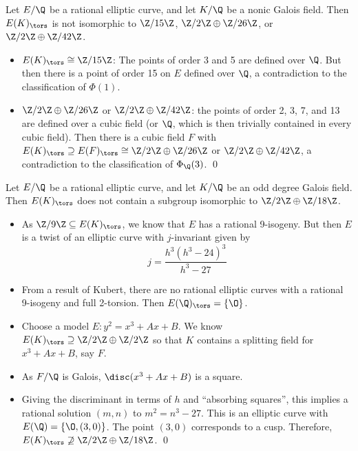 \begin{frame}[plain]
\begin{lem}
Let $E/\Q$ be a rational elliptic curve, and let $K/\Q$ be a nonic Galois field. Then $E(K)_\tors$ is not isomorphic to $\Z/15\Z$, $\Z/2\Z \oplus \Z/26\Z$, or $\Z/2\Z \oplus \Z/42\Z$. 
\end{lem}

\pf 
\begin{itemize}
\item $E(K)_\tors \cong \Z/15\Z$: The points of order 3 and 5 are defined over $\Q$. But then there is a point of order 15 on $E$ defined over $\Q$, a contradiction to the classification of $\Phi(1)$. 
\item $\Z/2\Z \oplus \Z/26\Z$ or $\Z/2\Z \oplus \Z/42\Z$: the points of order 2, 3, 7, and 13 are defined over a cubic field (or $\Q$, which is then trivially contained in every cubic field). Then there is a cubic field $F$ with $E(K)_\tors \supseteq E(F)_\tors \cong \Z/2\Z \oplus \Z/26\Z$ or $\Z/2\Z \oplus \Z/42\Z$, a contradiction to the classification of $\Phi_\Q(3)$. \hfill\qed
\end{itemize}
\end{frame}





\begin{frame}[plain]
\footnotesize
\begin{lem}
Let $E/\Q$ be a rational elliptic curve, and let $K/\Q$ be an odd degree Galois field. Then $E(K)_\tors$ does not contain a subgroup isomorphic to $\Z/2\Z \oplus \Z/18\Z$. 
\end{lem}

\pf 
\begin{itemize} 
\item As $\Z/9\Z \subseteq E(K)_\tors$, we know that $E$ has a rational 9-isogeny. But then $E$ is a twist of an elliptic curve with $j$-invariant given by
	\[
	j= \dfrac{h^3(h^3 - 24)^3}{h^3 - 27}
	\]
\item From a result of Kubert, there are no rational elliptic curves with a rational 9-isogeny and full 2-torsion. Then $E(\Q)_\tors= \{ \O \}$. 
\item Choose a model $E: y^2= x^3 + Ax + B$. We know $E(K)_\tors \supseteq \Z/2\Z \oplus \Z/2\Z$ so that $K$ contains a splitting field for $x^3 + Ax + B$, say $F$. \item As $F/\Q$ is Galois, $\disc( x^3 + Ax + B)$ is a square. 
\item Giving the discriminant in terms of $h$ and ``absorbing squares'', this implies a rational solution $(m, n)$ to $m^2= n^3 - 27$. This is an elliptic curve with $E(\Q)= \{ \O, (3,0) \}$. The point $(3, 0)$ corresponds to a cusp. Therefore, $E(K)_\tors \not\supseteq \Z/2\Z \oplus \Z/18\Z$. \hfill\qed
\end{itemize}
\end{frame}





